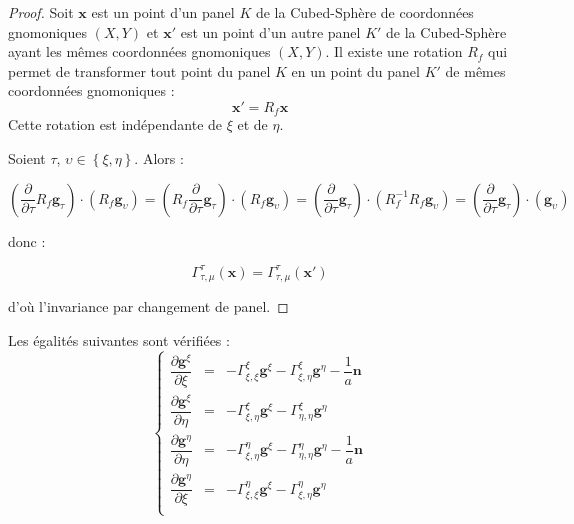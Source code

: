 \begin{proof}
Soit $\mathbf{x}$ est un point d'un panel $K$ de la Cubed-Sphère de coordonnées gnomoniques $(X,Y)$ et $\mathbf{x}'$ est un point d'un autre panel $K'$ de la Cubed-Sphère ayant les mêmes coordonnées gnomoniques $(X,Y)$. Il existe une rotation $R_f$ qui permet de transformer tout point du panel $K$ en un point du panel $K'$ de mêmes coordonnées gnomoniques :
\begin{equation}
\mathbf{x}' = R_f \mathbf{x}
\end{equation}
Cette rotation est indépendante de $\xi$ et de $\eta$.

Soient $\tau$, $\upsilon \in \left\lbrace \xi, \eta \right\rbrace$. Alors :

$$\left( \dfrac{\partial}{\partial \tau}  R_f \mathbf{g}_{\tau} \right) \cdot \left( R_f \mathbf{g}_{\upsilon} \right) = \left( R_f \dfrac{\partial}{\partial \tau}   \mathbf{g}_{\tau} \right) \cdot \left( R_f \mathbf{g}_{\upsilon} \right) =  \left( \dfrac{\partial}{\partial \tau}  \mathbf{g}_{\tau} \right) \cdot \left( R_f^{-1} R_f \mathbf{g}_{\upsilon} \right) =  \left( \dfrac{\partial}{\partial \tau}  \mathbf{g}_{\tau} \right) \cdot \left( \mathbf{g}_{\upsilon} \right)$$

donc :

$$\Gamma_{\tau, \mu}^{\tau}(\mathbf{x})=\Gamma_{\tau, \mu}^{\tau}(\mathbf{x}')$$

d'où l'invariance par changement de panel.
\end{proof}

\begin{proposition}
Les égalités suivantes sont vérifiées :
\begin{equation}
\left\lbrace
\begin{array}{rcl}
\dfrac{\partial \mathbf{g}^{\xi}}{\partial \xi} & = & - \Gamma_{\xi, \xi}^{\xi} \mathbf{g}^{\xi} - \Gamma_{\xi, \eta}^{\xi} \mathbf{g}^{\eta}- \dfrac{1}{a} \mathbf{n}\\

\dfrac{\partial \mathbf{g}^{\xi}}{\partial \eta} & = & - \Gamma_{\xi, \eta}^{\xi} \mathbf{g}^{\xi} - \Gamma_{\eta, \eta}^{\xi} \mathbf{g}^{\eta}\\

\dfrac{\partial \mathbf{g}^{\eta}}{\partial \eta} & = & - \Gamma_{\xi, \eta}^{\eta} \mathbf{g}^{\xi} - \Gamma_{\eta, \eta}^{\eta} \mathbf{g}^{\eta}- \dfrac{1}{a} \mathbf{n}\\

\dfrac{\partial \mathbf{g}^{\eta}}{\partial \xi} & = & - \Gamma_{\xi, \xi}^{\eta} \mathbf{g}^{\xi} - \Gamma_{\xi, \eta}^{\eta} \mathbf{g}^{\eta}\\
\end{array}
\right.
\end{equation}
\end{proposition}

